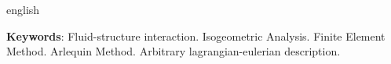 \begin{resumo}[Abstract]
\begin{otherlanguage*}{english}
\vspace{\onelineskip}

\noindent 
   \textbf{Keywords}: Fluid-structure interaction. Isogeometric Analysis. Finite Element Method. Arlequin Method. Arbitrary lagrangian-eulerian description.
 \end{otherlanguage*}
\end{resumo}
